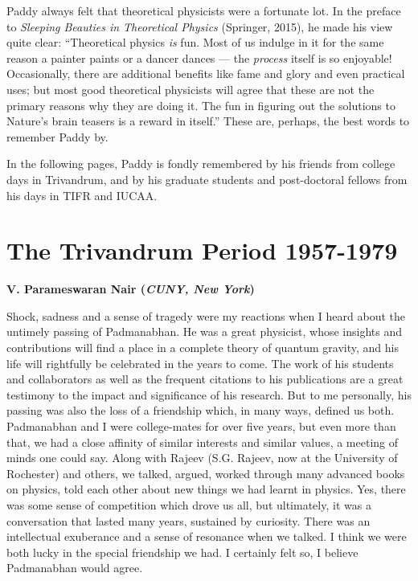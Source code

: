 \documentclass[prd, preprint, longbibliography, 12pt]{revtex4-2}
\begin{document}
Paddy always felt that theoretical physicists were a fortunate lot.
In the preface to  \textit{Sleeping Beauties in Theoretical Physics}
(Springer, 2015), he made his view quite clear: ``Theoretical physics
\textit{is}  fun.
Most of us indulge in it for the same reason a painter paints or a
dancer dances --- the \textit{process} itself is so enjoyable!
Occasionally, there are additional benefits like fame and glory and
even practical uses; but most good theoretical physicists will agree
that these are not the primary reasons why they are doing it.
The fun in figuring out the solutions to Nature's brain teasers is a
reward in itself.'' 
These are, perhaps, the best words to remember Paddy by.

\smallskip


 In the following pages, Paddy is fondly remembered by his friends from college days in Trivandrum, and by  his graduate students and post-doctoral fellows from his days in TIFR and IUCAA.

\section{The Trivandrum Period 1957-1979}
\smallskip
\centerline{\bf {V. Parameswaran Nair} ({\it CUNY, New York})}
\medskip
\noindent Shock, sadness and a sense of tragedy were my reactions when I heard about the untimely passing of Padmanabhan. He was a great physicist, whose insights and contributions will find a place in a complete theory of quantum gravity, and his life will rightfully be celebrated in the years to come. The work of his students and collaborators as well as the frequent citations to his publications are a great testimony to the impact and significance of his research.  But to me personally, his passing was also the loss of a friendship which, in many ways, defined us both. Padmanabhan and I were college-mates for over five years, but even more than that, we had a close affinity of similar interests and similar values, a meeting of minds one could say. 
Along with Rajeev (S.G. Rajeev, now at the University of Rochester) and others, we talked, argued, worked through many advanced books on physics, told each other about new things we had learnt in physics. Yes, there was some sense of competition which drove us all, but ultimately, it was a conversation that lasted many years, sustained by curiosity. There was an intellectual exuberance and a sense of resonance when we talked. I think we were 
both lucky in the special friendship we had. I certainly felt so, I believe Padmanabhan would agree. 
\end{document}
